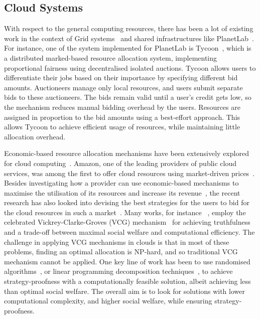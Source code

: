 \subsection{Cloud Systems}
\label{sec__related_work_cloud}

With respect to the general computing resources, there
has been a lot of existing work in the context of 
Grid systems~\cite{Foster2003, Buyya2005, Courcoubetis2012}
and shared infrastructures like PlanetLab~\cite{Leon2013Economic}.
For instance, one of the system implemented for PlanetLab is Tycoon~\cite{Lai2004}, 
which is a distributed marked-based resource allocation system,
implementing proportional fairness using decentralised isolated auctions.
Tycoon allows users to differentiate their jobs based 
on their importance by specifying different bid amounts.
Auctioneers manage only local resources, 
and users submit separate bids to these auctioneers.
The bids remain valid until a user's credit gets low, 
so the mechanism reduces manual bidding overhead by the users. 
Resources are assigned in proportion to the bid amounts using a best-effort approach.
This allows Tycoon to achieve efficient usage of resources, while maintaining little allocation overhead.

Economic-based resource allocation mechanisms have been extensively explored for cloud 
computing~\cite{Niu2012, Popa2012, Shi2014, Wang2012When, Zhang2013Framework, Zhang2015Truthful, Zheng2014Star, Zheng2015}.
Amazon, one of the leading providers of public cloud services, was among the first to offer
cloud resources using market-driven prices~\cite{BenYehuda2013}.
Besides investigating how a provider can use economic-based mechanisms to maximise 
the utilisation of its resources and increase its revenue~\cite{Wang2012When}, 
the recent research has also looked into devising the best strategies for the users to
bid for the cloud resources in such a market~\cite{Zheng2015}.
Many works, for instance ~\cite{Zhang2014Dynamic, Zhang2015Truthful}, 
employ the celebrated Vickrey-Clarke-Groves (VCG) mechanism~\cite{Nisan2001}
for achieving truthfulness and a trade-off between 
maximal social welfare and computational efficiency.
The challenge in applying VCG mechanisms in clouds is that in most of these problems,
finding an optimal allocation is NP-hard,
and so traditional VCG mechanism cannot be applied.
One key line of work has been to use randomised algorithms~\cite{Zhang2014Dynamic, Zhang2015Truthful},
or linear programming decomposition techniques~\cite{Niu2013, Zhang2015Online},
to achieve strategy-proofness with a computationally feasible solution,
albeit achieving less than optimal social welfare.
The overall aim is to look for solutions with lower computational complexity, 
and higher social welfare, while ensuring strategy-proofness.

